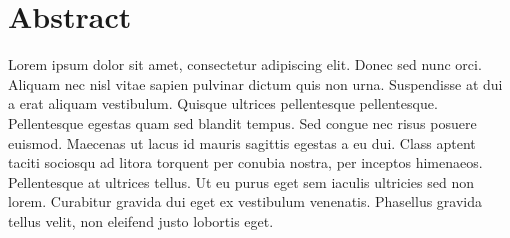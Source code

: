 %
%
%
%

\chapter*{Abstract} %
\label{abtract}


Lorem ipsum dolor sit amet, consectetur adipiscing elit. Donec sed nunc orci.
Aliquam nec nisl vitae sapien pulvinar dictum quis non urna. Suspendisse at dui a
erat aliquam vestibulum. Quisque ultrices pellentesque pellentesque. Pellentesque
egestas quam sed blandit tempus. Sed congue nec risus posuere euismod. Maecenas ut
lacus id mauris sagittis egestas a eu dui. Class aptent taciti sociosqu ad
litora torquent per conubia nostra, per inceptos himenaeos. Pellentesque at
ultrices tellus. Ut eu purus eget sem iaculis ultricies sed non lorem. Curabitur
gravida dui eget ex vestibulum venenatis. Phasellus gravida tellus velit, non
eleifend justo lobortis eget.